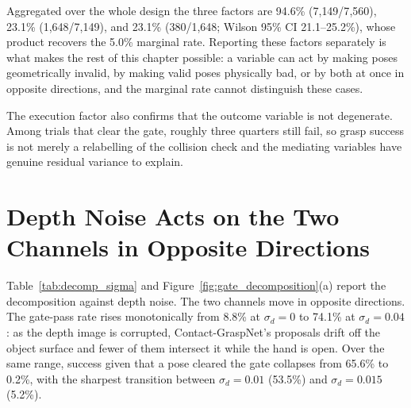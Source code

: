 \documentclass[11pt,a4paper]{report}
\begin{document}
Aggregated over the whole design the three factors are 94.6\% (7{,}149/7{,}560), 23.1\% (1{,}648/7{,}149), and 23.1\% (380/1{,}648; Wilson 95\% CI 21.1--25.2\%), whose product recovers the 5.0\% marginal rate. Reporting these factors separately is what makes the rest of this chapter possible: a variable can act by making poses geometrically invalid, by making valid poses physically bad, or by both at once in opposite directions, and the marginal rate cannot distinguish these cases.

The execution factor also confirms that the outcome variable is not degenerate. Among trials that clear the gate, roughly three quarters still fail, so grasp success is not merely a relabelling of the collision check and the mediating variables have genuine residual variance to explain.

\section{Depth Noise Acts on the Two Channels in Opposite Directions}
\label{sec:noise_channels}

Table~\ref{tab:decomp_sigma} and Figure~\ref{fig:gate_decomposition}(a) report the decomposition against depth noise. The two channels move in opposite directions. The gate-pass rate rises monotonically from 8.8\% at $\sigma_d = 0$ to 74.1\% at $\sigma_d = 0.04$: as the depth image is corrupted, Contact-GraspNet's proposals drift off the object surface and fewer of them intersect it while the hand is open. Over the same range, success given that a pose cleared the gate collapses from 65.6\% to 0.2\%, with the sharpest transition between $\sigma_d = 0.01$ (53.5\%) and $\sigma_d = 0.015$ (5.2\%).
\end{document}
